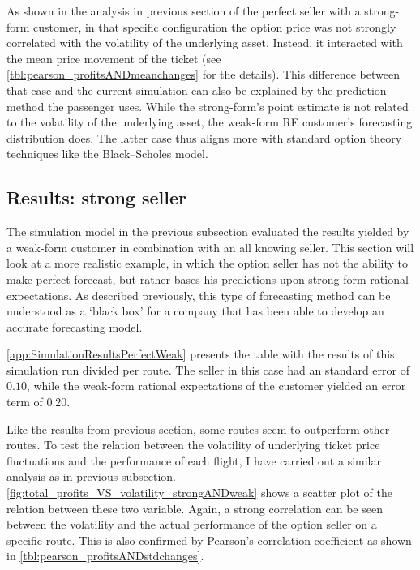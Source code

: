 

As shown in the analysis in previous section of the perfect seller with a strong-form customer, in that specific configuration the option price was not strongly correlated with the volatility of the underlying asset. Instead, it interacted with the mean price movement of the ticket (see \autoref{tbl:pearson_profitsANDmeanchanges} for the details). This difference between that case and the current simulation can also be explained by the prediction method the passenger uses. While the strong-form's point estimate is not related to the volatility of the underlying asset, the weak-form RE customer's forecasting distribution does. The latter case thus aligns more with standard option theory techniques like the Black--Scholes model.

\subsection{Results: strong seller}
The simulation model in the previous subsection evaluated the results yielded by a weak-form customer in combination with an all knowing seller. This section will look at a more realistic example, in which the option seller has not the ability to make perfect forecast, but rather bases his predictions upon strong-form rational expectations. As described previously, this type of forecasting method can be understood as a `black box' for a company that has been able to develop an accurate forecasting model.

\autoref{app:SimulationResultsPerfectWeak} presents the table with the results of this simulation run divided per route. The seller in this case had an standard error of $0.10$, while the weak-form rational expectations of the customer yielded an error term of $0.20$.


Like the results from previous section, some routes seem to outperform other routes. To test the relation between the volatility of underlying ticket price fluctuations and the performance of each flight, I have carried out a similar analysis as in previous subsection. \autoref{fig:total_profits_VS_volatility_strongANDweak} shows a scatter plot of the relation between these two variable. Again, a strong correlation can be seen between the volatility and the actual performance of the option seller on a specific route. This is also confirmed by Pearson's correlation coefficient as shown in \autoref{tbl:pearson_profitsANDstdchanges}.

